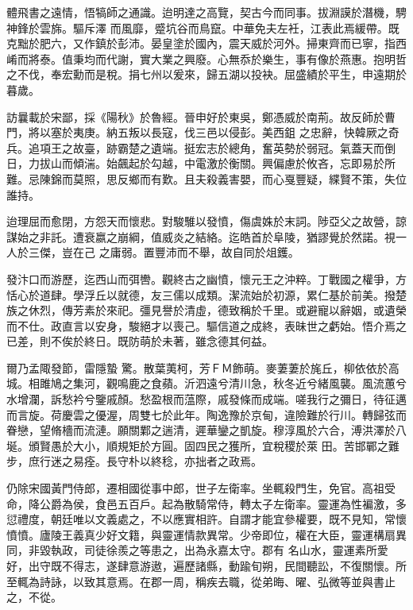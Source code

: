 \begin{pinyinscope}
 體飛書之遠情，悟犒師之通識。迨明達之高覽，契古今而同事。拔淵謨於潛機，騁神鋒於雲旆。驅斥澤
 而風靡，蹙坑谷而鳥竄。中華免夫左衽，江表此焉緩帶。既克黜於肥六，又作鎮於彭沛。晏皇塗於國內，震天威於河外。掃東齊而已寧，指西崤而將泰。值秉均而代謝，實大業之興廢。心無忝於樂生，事有像於燕惠。抱明哲之不伐，奉宏勳而是稅。捐七州以爰來，歸五湖以投袂。屈盛績於平生，申遠期於暮歲。



 訪曩載於宋鄙，採《陽秋》於魯經。晉申好於東吳，鄭憑威於南荊。故反師於曹門，將以塞於夷庚。納五叛以長寇，伐三邑以侵彭。美西鉏
 之忠辭，快韓厥之奇兵。追項王之故臺，跡霸楚之遺端。挺宏志於總角，奮英勢於弱冠。氣蓋天而倒日，力拔山而傾湍。始飆起於勾越，中電激於衡關。興偏慮於攸吝，忘即易於所難。忌陳錦而莫照，思反鄉而有歎。且夫殺義害嬰，而心戛豐疑，緤賢不策，失位誰持。



 迨理屈而愈閉，方怨天而懷悲。對駿騅以發憤，傷虞姝於末詞。陟亞父之故營，諒謀始之非託。遭衰嬴之崩綱，值威炎之結絡。迄皓首於阜陵，猶謬覺於然諾。視一人於三傑，豈在己
 之庸弱。置豐沛而不舉，故自同於俎鑊。



 發汴口而游歷，迄西山而弭轡。觀終古之幽憤，懷元王之沖粹。丁戰國之權爭，方恬心於道肆。學浮丘以就德，友三儒以成類。潔流始於初源，累仁基於前美。撥楚族之休烈，傳芳素於來祀。彊見譽於清虛，德致稱於千里。或避寵以辭姻，或遺榮而不仕。政直言以安身，駿絕才以喪己。驅信道之成終，表昧世之虧始。悟介焉之已差，則不俟於終日。既防萌於未著，雖念德其何益。



 爾乃孟陬發節，雷隱蟄
 驚。散葉荑柯，芳ＦＭ飾萌。麥萋萋於旄丘，柳依依於高城。相雎鳩之集河，觀鳴鹿之食蘋。沂泗遠兮清川急，秋冬近兮緒風襲。風流蕙兮水增瀾，訴愁衿兮鑒戚顏。愁盈根而蕰際，戚發條而成端。嗟我行之彌日，待征邁而言旋。荷慶雲之優渥，周雙七於此年。陶逸豫於京甸，違險難於行川。轉歸弦而眷戀，望脩檣而流漣。願關鄴之遄清，遲華鑾之凱旋。穆淳風於六合，溥洪澤於八埏。頒賢愚於大小，順規矩於方圓。固四民之獲所，宜稅稷於萊
 田。苦邯鄲之難步，庶行迷之易痊。長守朴以終稔，亦拙者之政焉。



 仍除宋國黃門侍郎，遷相國從事中郎，世子左衛率。坐輒殺門生，免官。高祖受命，降公爵為侯，食邑五百戶。起為散騎常侍，轉太子左衛率。靈運為性褊激，多愆禮度，朝廷唯以文義處之，不以應實相許。自謂才能宜參權要，既不見知，常懷憤憤。廬陵王義真少好文籍，與靈運情款異常。少帝即位，權在大臣，靈運構扇異同，非毀執政，司徒徐羨之等患之，出為永嘉太守。郡有
 名山水，靈運素所愛好，出守既不得志，遂肆意游遨，遍歷諸縣，動踰旬朔，民間聽訟，不復關懷。所至輒為詩詠，以致其意焉。在郡一周，稱疾去職，從弟晦、曜、弘微等並與書止之，不從。




\end{pinyinscope}
